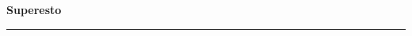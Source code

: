 \documentclass[10pt]{book}
\begin{document}
{
  \samepage
  \raggedbottom
  \raggedright
  \sloppy


  \vspace{0.2in}

  \noindent\begin{minipage}{.1\textwidth}
    \hfill\vspace{0.1in}
  \end{minipage}%
  \noindent\begin{minipage}{.8\textwidth}
    \centering
    \bfseries
    \large Superesto
  \end{minipage}%
  \noindent\begin{minipage}{.1\textwidth}
      \hfill\vspace{0.1in}
  \end{minipage}

  \nopagebreak[4]
  \vspace{0.1in}
  \nopagebreak[4]
  \hrule height 0.05ex
  \nopagebreak[4]
  \vspace{-0.05in}




}
\end{document}
